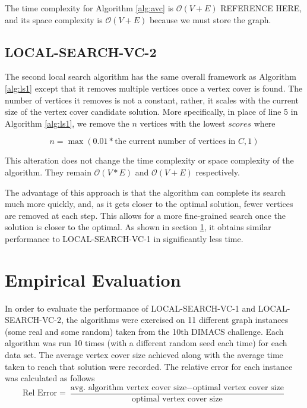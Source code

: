 \documentclass[sigconf]{acmart}
\newcommand{\bigo}[1]{\mathcal{O}(#1)}
\begin{document}
The time complexity for Algorithm \ref{alg:avc} is $\bigo{V + E}$ REFERENCE HERE, and its space complexity is $\bigo{V + E}$ because we must store the graph.  

\subsection{LOCAL-SEARCH-VC-2}
The second local search algorithm has the same overall framework as Algorithm \ref{alg:ls1} except that it removes multiple vertices once a vertex cover is found. The number of vertices it removes is not a constant, rather, it scales with the current size of the vertex cover candidate solution. More specifically, in place of line 5 in Algorithm \ref{alg:ls1}, we remove the $n$ vertices with the lowest $scores$ where

\begin{equation}
	n = \max(0.01 * \textrm{the current number of vertices in $C$}, 1)
\end{equation}

This alteration does not change the time complexity or space complexity of the algorithm. They remain $\bigo{V * E}$ and $\bigo{V + E}$ respectively.

The advantage of this approach is that the algorithm can complete its search much more quickly, and, as it gets closer to the optimal solution, fewer vertices are removed at each step. This allows for a more fine-grained search once the solution is closer to the optimal. As shown in section \ref{sec:eval}, it obtains similar performance to LOCAL-SEARCH-VC-1 in significantly less time.

\section{Empirical Evaluation} \label{sec:eval}
In order to evaluate the performance of LOCAL-SEARCH-VC-1 and LOCAL-SEARCH-VC-2, the algorithms were exercised on 11 different graph instances (some real and some random) taken from the 10th DIMACS challenge. Each algorithm was run 10 times (with a different random seed each time) for each data set. The average vertex cover size achieved along with the average time taken to reach that solution were recorded. The relative error for each instance was calculated as follows
\begin{equation*}
	\textrm{Rel Error} = \frac{\textrm{avg. algorithm vertex cover size} - \textrm{optimal vertex cover size}}{\textrm{optimal vertex cover size}}
\end{equation*} 
\end{document}
